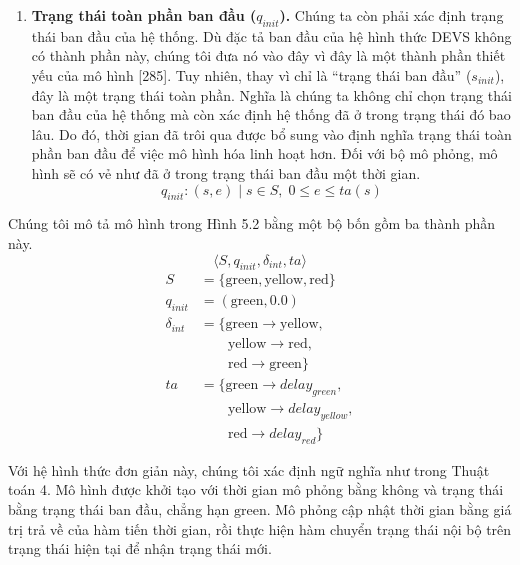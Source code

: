 \begin{enumerate}
\[
\delta_{int}:S\rightarrow S
\]
\item \textbf{Trạng thái toàn phần ban đầu ($q_{init}$).} Chúng ta còn phải xác định trạng thái ban đầu của hệ thống. Dù đặc tả ban đầu của hệ hình thức DEVS không có thành phần này, chúng tôi đưa nó vào đây vì đây là một thành phần thiết yếu của mô hình [285]. Tuy nhiên, thay vì chỉ là ``trạng thái ban đầu'' ($s_{init}$), đây là một trạng thái toàn phần. Nghĩa là chúng ta không chỉ chọn trạng thái ban đầu của hệ thống mà còn xác định hệ thống đã ở trong trạng thái đó bao lâu. Do đó, thời gian đã trôi qua được bổ sung vào định nghĩa trạng thái toàn phần ban đầu để việc mô hình hóa linh hoạt hơn. Đối với bộ mô phỏng, mô hình sẽ có vẻ như đã ở trong trạng thái ban đầu một thời gian.
\[
q_{init}:(s,e)\mid s\in S,\;0\leq e\leq ta(s)
\]
\end{enumerate}


Chúng tôi mô tả mô hình trong Hình 5.2 bằng một bộ bốn gồm ba thành phần này.
\[
\langle S,q_{init},\delta_{int},ta\rangle
\]
\begin{align*}
S &= \{\mathrm{green},\mathrm{yellow},\mathrm{red}\}\\
q_{init} &= (\mathrm{green},0.0)\\
\delta_{int} &= \{\mathrm{green}\rightarrow\mathrm{yellow},\\
&\qquad\mathrm{yellow}\rightarrow\mathrm{red},\\
&\qquad\mathrm{red}\rightarrow\mathrm{green}\}\\
ta &= \{\mathrm{green}\rightarrow delay_{green},\\
&\qquad\mathrm{yellow}\rightarrow delay_{yellow},\\
&\qquad\mathrm{red}\rightarrow delay_{red}\}
\end{align*}

Với hệ hình thức đơn giản này, chúng tôi xác định ngữ nghĩa như trong Thuật toán 4. Mô hình được khởi tạo với thời gian mô phỏng bằng không và trạng thái bằng trạng thái ban đầu, chẳng hạn $\mathrm{green}$. Mô phỏng cập nhật thời gian bằng giá trị trả về của hàm tiến thời gian, rồi thực hiện hàm chuyển trạng thái nội bộ trên trạng thái hiện tại để nhận trạng thái mới.

